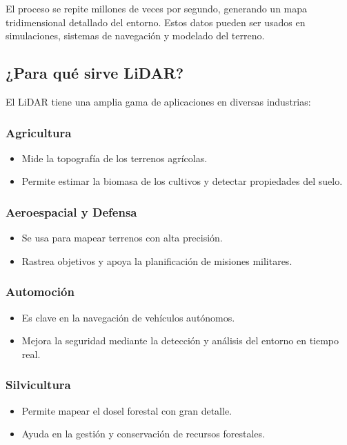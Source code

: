 \documentclass{article}
\begin{document}
	El proceso se repite millones de veces por segundo, generando un mapa tridimensional detallado del entorno. Estos datos pueden ser usados en simulaciones, sistemas de navegación y modelado del terreno.
	\subsection{¿Para qué sirve LiDAR?}
	El LiDAR tiene una amplia gama de aplicaciones en diversas industrias:
	
	\subsubsection{Agricultura}
	\begin{itemize}
		\item Mide la topografía de los terrenos agrícolas.
		\item Permite estimar la biomasa de los cultivos y detectar propiedades del suelo.
	\end{itemize}
	
	\subsubsection{Aeroespacial y Defensa}
	\begin{itemize}
		\item Se usa para mapear terrenos con alta precisión.
		\item Rastrea objetivos y apoya la planificación de misiones militares.
	\end{itemize}
	
	\subsubsection{Automoción}
	\begin{itemize}
		\item Es clave en la navegación de vehículos autónomos.
		\item Mejora la seguridad mediante la detección y análisis del entorno en tiempo real.
	\end{itemize}
	
	\subsubsection{Silvicultura}
	\begin{itemize}
		\item Permite mapear el dosel forestal con gran detalle.
		\item Ayuda en la gestión y conservación de recursos forestales.
	\end{itemize}
	
\end{document}
